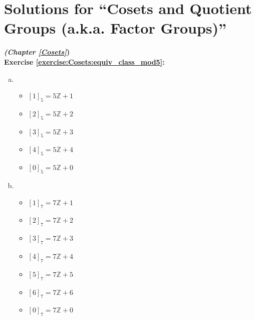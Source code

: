 
\section{Solutions for ``Cosets and Quotient Groups (a.k.a. Factor Groups)''}
\noindent\textbf{\textit{(Chapter \ref{Cosets}})}\bigskip
\\
\textbf{Exercise \ref{exercise:Cosets:equiv_class_mod5}:}
\begin{multicols}{2}
\begin{enumerate}[(a)]
\item
	\begin{itemize}
	\item
	$[1]_5 = 5{\mathbb Z} + 1$
	\item
	$[2]_5 = 5{\mathbb Z} + 2$
	\item
	$[3]_5 = 5{\mathbb Z} + 3$
	\item
	$[4]_5 = 5{\mathbb Z} + 4$
	\item
	$[0]_5 = 5{\mathbb Z} + 0$
	\end{itemize}
\columnbreak	
\item
	\begin{itemize}
	\item
	$[1]_7 = 7{\mathbb Z} + 1$
	\item
	$[2]_7 = 7{\mathbb Z} + 2$
	\item
	$[3]_7 = 7{\mathbb Z} + 3$
	\item
	$[4]_7 = 7{\mathbb Z} + 4$
	\item
	$[5]_7 = 7{\mathbb Z} + 5$
	\item
	$[6]_7 = 7{\mathbb Z} + 6$
	\item
	$[0]_7 = 7{\mathbb Z} + 0$
	\end{itemize}
\end{enumerate}
\end{multicols}

